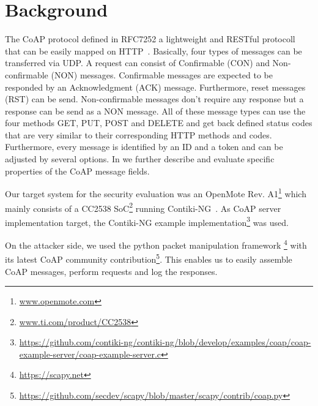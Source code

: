 \section{Background}
\label{section:background}


The CoAP protocol defined in RFC7252 a lightweight and RESTful protocoll that can be easily mapped on HTTP~\cite{RFC7252}. Basically, four types of messages can be transferred via UDP. A request can consist of Confirmable (CON) and Non-confirmable (NON) messages. Confirmable messages are expected to be responded by an Acknowledgment (ACK) message. Furthermore, reset messages (RST) can be send. Non-confirmable messages don't require any response but a response can be send as a NON message. All of these message types can use the four methods GET, PUT, POST and DELETE and get back defined status codes that are very similar to their corresponding HTTP methods and codes. Furthermore, every message is identified by an ID and a token and can be adjusted by several options. In  we further describe and evaluate specific properties of the CoAP message fields.

Our target system for the security evaluation was an OpenMote Rev. A1\footnote{\url{www.openmote.com}} which mainly consists of a CC2538 SoC\footnote{\url{www.ti.com/product/CC2538}} running Contiki-NG~\cite{contiki}. As CoAP server implementation target, the Contiki-NG example implementation\footnote{\url{https://github.com/contiki-ng/contiki-ng/blob/develop/examples/coap/coap-example-server/coap-example-server.c}} was used.

On the attacker side, we used the python packet manipulation framework \scapy\footnote{\url{https://scapy.net}} with its latest CoAP community contribution\footnote{\url{https://github.com/secdev/scapy/blob/master/scapy/contrib/coap.py}}. This enables us to easily assemble CoAP messages, perform requests and log the responses.

